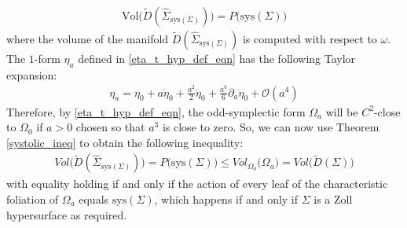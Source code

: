 \documentclass[11pt]{amsart}
\theoremstyle{plain}
\theoremstyle{definition}
\theoremstyle{remark}
\begin{document}
\begin{align}
\text{Vol}\big(\tilde D(\hat{\Sigma}_{\text{sys}(\Sigma)})\big) = P\big(\text{sys}(\Sigma)\big)
\end{align}
where the volume of the manifold $\tilde D(\hat{\Sigma}_{\text{sys}(\Sigma)})$ is computed with respect to $\omega$. The $1$-form $\eta_a$ defined in \eqref{eta_t_hyp_def_eqn} has the following Taylor expansion:
\begin{align}\label{eta_taylor}
    \eta_a = \eta_0 + a\dot\eta_0 + \frac{a^2}{2}\ddot \eta_0 + \frac{a^3}{6} \partial_a\ddot \eta_0 + \mathcal{O}(a^4)
\end{align}
Therefore, by \eqref{eta_t_hyp_def_eqn}, the odd-symplectic form $\Omega_a$ will be $C^2$-close to $\Omega_0$ if $a>0$ chosen so that $a^3$ is close to zero. So, we can now use Theorem \ref{systolic_ineq} to obtain the following inequality:
\begin{align}
    Vol\big(\tilde D(\hat{\Sigma}_{\text{sys}(\Sigma)})\big) = P\big(\text{sys}(\Sigma)\big) \leq Vol_{\Omega_0}\big(\Omega_a\big) = Vol\big(\tilde D(\Sigma)\big)
\end{align}
with equality holding if and only if the action of every leaf of the characteristic foliation of $\Omega_a$ equals $\text{sys}(\Sigma)$, which happens if and only if $\Sigma$ is a Zoll hypersurface as required.  
\end{document}
